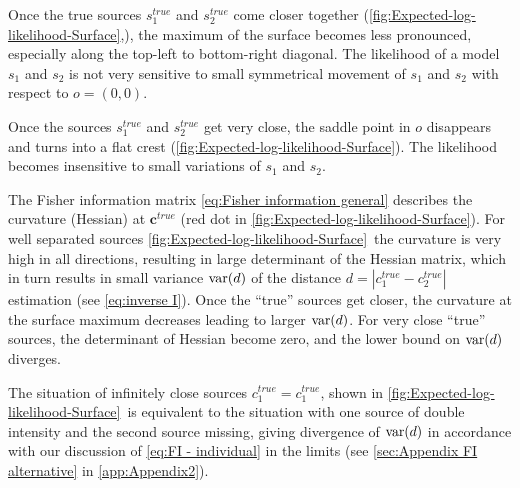 Once the true sources $s_1^{true}$ and $s_2^{true}$ come closer together (\autoref{fig:Expected-log-likelihood-Surface}\bbb,\ccc), the maximum of the surface becomes less pronounced, especially along the top-left to bottom-right diagonal. The likelihood of a model $s_1$ and $s_2$ is not very sensitive to small symmetrical movement of $s_1$ and $s_2$ with respect to $o=(0,0)$. 

Once the sources $s_1^{true}$ and $s_2^{true}$ get very close, the saddle point in $o$ disappears and turns into a flat crest (\autoref{fig:Expected-log-likelihood-Surface}\ddd). The likelihood becomes insensitive to small variations of $s_1$ and $s_2$. 

The Fisher information matrix \autoref{eq:Fisher information general} describes the curvature (Hessian) at $\bm{c}^{true}$ (red dot in \autoref{fig:Expected-log-likelihood-Surface}\aaa). For well separated sources \autoref{fig:Expected-log-likelihood-Surface}\aaa\ the curvature is very high in all directions, resulting in large determinant of the Hessian matrix, which in turn results in small variance $\mathrm{var}(d)$ of the distance $d=\left|c_1^{true}-c_2^{true}\right|$ estimation  (see \autoref{eq:inverse I}). Once the ``true'' sources get closer, the curvature at the surface maximum decreases leading to larger $\mathrm{var}(d)$. For very close ``true'' sources, the determinant of Hessian become zero, and the lower bound on $\mathrm{var}(d)$ diverges. 

The situation of infinitely close sources $c_1^{true}=c_1^{true}$, shown in \autoref{fig:Expected-log-likelihood-Surface}\ddd\  is equivalent to the situation with one source of double intensity and the second source missing, giving divergence of $\mathrm{var}(d)$ in accordance with our discussion of \autoref{eq:FI - individual} in the limits  (see \autoref{sec:Appendix FI alternative} in \autoref{app:Appendix2}).

